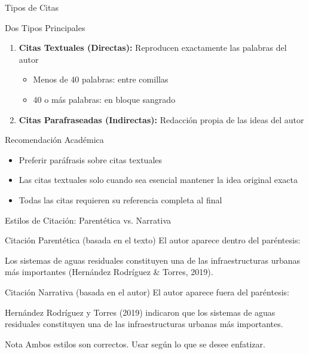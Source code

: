 \documentclass[spanish,aspectratio=169]{beamer}
\begin{document}
	\begin{frame}{Tipos de Citas}
		\begin{block}{Dos Tipos Principales}
			\begin{enumerate}
				\item \textbf{Citas Textuales (Directas):} Reproducen exactamente las palabras del autor
				\begin{itemize}
					\item Menos de 40 palabras: entre comillas
					\item 40 o más palabras: en bloque sangrado
				\end{itemize}
				\item \textbf{Citas Parafraseadas (Indirectas):} Redacción propia de las ideas del autor
		\end{enumerate}
	\end{block}
	
	\begin{alertblock}{Recomendación Académica}
		\begin{itemize}
			\item Preferir paráfrasis sobre citas textuales
			\item Las citas textuales solo cuando sea esencial mantener la idea original exacta
			\item Todas las citas requieren su referencia completa al final
		\end{itemize}
	\end{alertblock}
\end{frame}

\begin{frame}{Estilos de Citación: Parentética vs. Narrativa}
	\begin{block}{Citación Parentética (basada en el texto)}
		El autor aparece \alert{dentro} del paréntesis:
		
		\vspace{0.2cm}
		\small
		Los sistemas de aguas residuales constituyen una de las infraestructuras urbanas más importantes (Hernández Rodríguez \& Torres, 2019).
	\end{block}
	
	\begin{block}{Citación Narrativa (basada en el autor)}
		El autor aparece \alert{fuera} del paréntesis:
		
		\vspace{0.2cm}
		\small
		Hernández Rodríguez y Torres (2019) indicaron que los sistemas de aguas residuales constituyen una de las infraestructuras urbanas más importantes.
	\end{block}
	
	\begin{alertblock}{Nota}
		Ambos estilos son correctos. Usar según lo que se desee enfatizar.
	\end{alertblock}
\end{frame}
\end{document}
